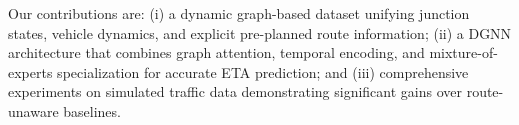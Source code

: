 Our contributions are: (i) a dynamic graph-based dataset unifying junction states, vehicle dynamics, and explicit pre-planned route information; (ii) a DGNN architecture that combines graph attention, temporal encoding, and mixture-of-experts specialization for accurate ETA prediction; and (iii) comprehensive experiments on simulated traffic data demonstrating significant gains over route-unaware baselines.
